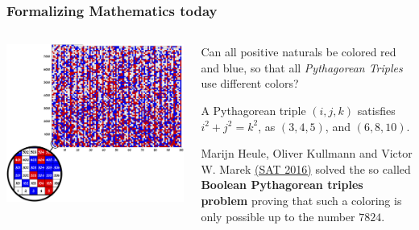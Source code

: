 \documentclass[10pt]{beamer}
\begin{document}
\begin{frame}\frametitle{Formalizing Mathematics today}


  \begin{columns}
\begin{column}{0.45\textwidth}
\includegraphics[scale=.27]{figs/PitagoreanTriples.png}
\end{column}
\begin{column}{0.5\textwidth}
Can all positive naturals be colored {\color{red}red} and
{\color{blue}blue}, so that all {\it Pythagorean
Triples} use  different colors?

A Pythagorean triple $(i, j, k)$ satisfies $i^2+j^2 = k^2$, as
$(3,4,5)$, and $(6,8,10)$.

Marijn Heule, Oliver Kullmann and Victor W. Marek \href{https://doi.org/10.1007/978-3-319-40970-2_15}{\color{blue}(SAT 2016)} solved the so called
{\bf Boolean Pythagorean triples problem} proving that such a
coloring is only possible up to the number $7824$. 
  
  \end{column}


\end{columns}

\end{frame}
\end{document}
